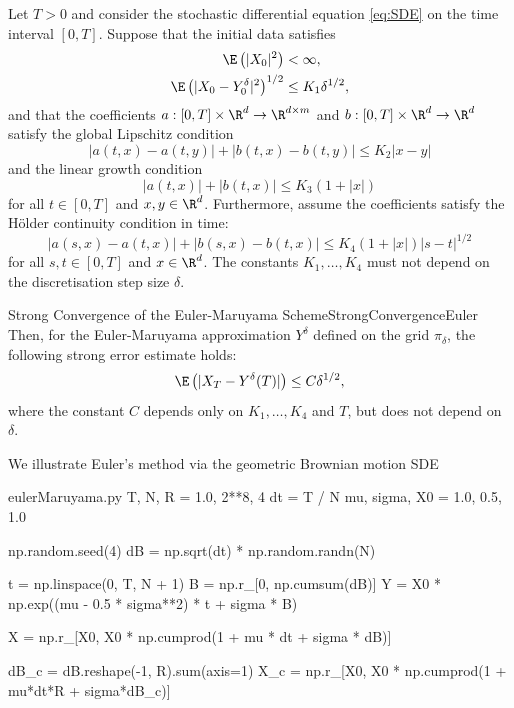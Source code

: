 Let $T > 0$ and consider the stochastic differential equation \cref{eq:SDE} on the time interval $[0, T]$. Suppose that the initial data satisfies
\begin{align}
    \E \left(|X_0|^2\right) &< \infty, \label{eq:InitialMoment} \\
    \E \left(|X_0 - Y^\delta_0|^2\right)^{1/2} &\leq K_1 \delta^{1/2}, \label{eq:InitialApproximationError}
\end{align}
and that the coefficients $a: [0, T] \times \R^d \to \R^{d \times m}$ and $b: [0, T] \times \R^d \to \R^d$ satisfy the global Lipschitz condition
\begin{equation}
    |a(t, x) - a(t, y)| + |b(t, x) - b(t, y)| \leq K_2 |x - y| \label{eq:LipschitzConditionSDENumerics}
\end{equation}
and the linear growth condition
\begin{equation}
    |a(t, x)| + |b(t, x)| \leq K_3 (1 + |x|) \label{eq:LinearGrowthCondition}
\end{equation}
for all $t \in [0, T]$ and $x, y \in \R^d$. Furthermore, assume the coefficients satisfy the Hölder continuity condition in time:
\begin{equation}
    |a(s, x) - a(t, x)| + |b(s, x) - b(t, x)| \leq K_4 (1 + |x|) |s - t|^{1/2} \label{eq:HolderContinuity}
\end{equation}
for all $s, t \in [0, T]$ and $x \in \R^d$. The constants $K_1, \dots, K_4$ must not depend on the discretisation step size $\delta$.

\begin{thm}{Strong Convergence of the Euler-Maruyama Scheme}{StrongConvergenceEuler}
    Then, for the Euler-Maruyama approximation $Y^\delta$ defined on the grid $\pi_\delta$, the following strong error estimate holds:
    \begin{equation}
        \E \left(|X_T - Y^\delta(T)|\right) \leq C \delta^{1/2}, \label{eq:StrongConvergenceBound}
    \end{equation}
    where the constant $C$ depends only on $K_1, \dots, K_4$ and $T$, but does not depend on $\delta$.
\end{thm}

We illustrate Euler’s method via the geometric Brownian motion SDE

\begin{Pcode}{eulerMaruyama.py}
    T, N, R = 1.0, 2**8, 4
    dt = T / N
    mu, sigma, X0 = 1.0, 0.5, 1.0

    np.random.seed(4)
    dB = np.sqrt(dt) * np.random.randn(N)

    t = np.linspace(0, T, N + 1)
    B = np.r_[0, np.cumsum(dB)]
    Y = X0 * np.exp((mu - 0.5 * sigma**2) * t + sigma * B)

    X = np.r_[X0, X0 * np.cumprod(1 + mu * dt + sigma * dB)]

    dB_c = dB.reshape(-1, R).sum(axis=1)
    X_c = np.r_[X0, X0 * np.cumprod(1 + mu*dt*R + sigma*dB_c)]
\end{Pcode}

